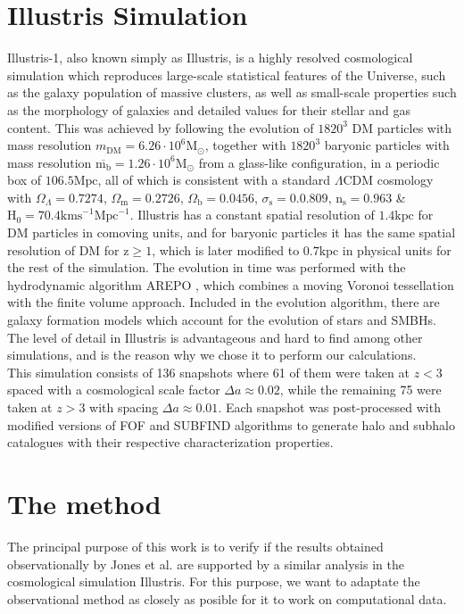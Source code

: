 \documentclass[a4paper,fleqn,usenatbib]{mnras}
\begin{document}
\section{Illustris Simulation}
Illustris-1, also known simply as Illustris, is a highly resolved cosmological simulation which reproduces large-scale statistical features of the Universe, such as the galaxy population of massive clusters, as well as small-scale properties such as the morphology of galaxies and detailed values for their stellar and gas content. This was achieved by following the evolution of $1820^3$ DM particles with mass resolution $m_{\text{DM}} = 6.26\cdot 10^6\text{M}_{\odot}$, together with $1820^3$ baryonic particles with mass resolution $\overline{\text{m}_\text{b}}=1.26\cdot 10^6\text{M}_{\odot}$ from a glass-like configuration, in a periodic box of $106.5\text{Mpc}$, all of which is consistent with a standard $\Lambda \text{CDM}$ cosmology with $\Omega_\Lambda=0.7274$, $\Omega_\text{m}=0.2726$, $\Omega_\text{b}=0.0456$, $\sigma_\text{s}=0.0.809$, $\text{n}_\text{s}=0.963$ \& $\text{H}_0=70.4\text{kms}
^{-1}\text{Mpc}^{-1}$. Illustris has a constant spatial resolution of $1.4\text{kpc}$ for DM particles in comoving units, and for baryonic particles it has the same spatial resolution of DM for $\text{z}\geq 1$, which is later modified to $0.7\text{kpc}$ in physical units for the rest of the simulation. The evolution in time was performed with the hydrodynamic algorithm AREPO \cite{arepo}, which combines a moving Voronoi tessellation with the finite volume approach. Included in the evolution algorithm, there are galaxy formation models which account for the evolution of stars and SMBHs. The level of detail in Illustris is advantageous and hard to find among other simulations, and is the reason why we chose it to perform our calculations.\\

This simulation consists of 136 snapshots where 61 of them were taken at $z < 3$ spaced with a cosmological scale factor $\Delta a \approx 0.02$, while the remaining 75 were taken at $z > 3$ with spacing $\Delta a \approx 0.01$. Each snapshot was post-processed with modified versions of FOF and SUBFIND algorithms \cite{fof,subfind} to generate halo and subhalo catalogues with their respective characterization properties.  

\section{The method}
The principal purpose of this work is to verify if the results obtained observationally by Jones et al. \cite{jones1} are supported by a similar analysis in the cosmological simulation Illustris. For this purpose, we want to adaptate the observational method as closely as posible for it to work on computational data.\\
\end{document}
